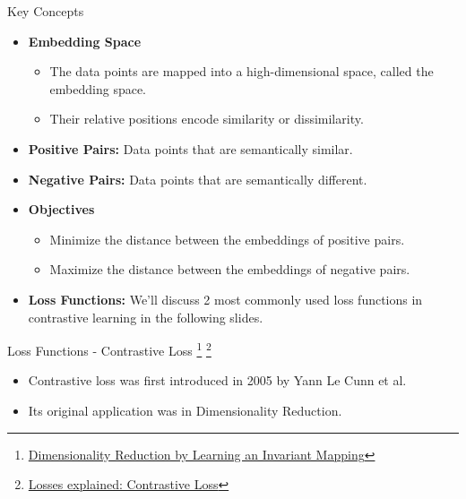 \documentclass[serif, aspectratio=169]{beamer}
\begin{document}
\begin{frame}{Key Concepts}
    \begin{itemize}
        \item \textbf{Embedding Space}
        \begin{itemize}
            \item The data points are mapped into a high-dimensional space, called the embedding space.
            \item Their relative positions encode similarity or dissimilarity.
        \end{itemize}
        
        \item \textbf{Positive Pairs:} Data points that are semantically similar.
        \item \textbf{Negative Pairs:} Data points that are semantically different.

        \item \textbf{Objectives}
        \begin{itemize}
            \item Minimize the distance between the embeddings of positive pairs.
            \item Maximize the distance between the embeddings of negative pairs.
        \end{itemize}

        \item \textbf{Loss Functions:} We'll discuss 2 most commonly used loss functions in contrastive learning in the following slides.
    \end{itemize}
\end{frame}


\begin{frame}{Loss Functions - Contrastive Loss
 \footnote{\href{http://yann.lecun.com/exdb/publis/pdf/hadsell-chopra-lecun-06.pdf}{Dimensionality Reduction by Learning an Invariant Mapping}}
 \footnote{\href{https://medium.com/@maksym.bekuzarov/losses-explained-contrastive-loss-f8f57fe32246}{Losses explained: Contrastive Loss}}
}
     \begin{itemize}
         \item Contrastive loss was first introduced in 2005 by Yann Le Cunn et al.
         \item Its original application was in Dimensionality Reduction.
     \end{itemize}
\end{frame}
\end{document}
